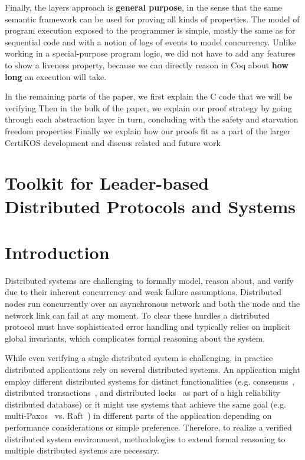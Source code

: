 Finally, the layers approach is {\bf general purpose}, in the sense
that the same semantic framework can be used for proving all kinds of
properties. The model of program execution exposed to the programmer
is simple, mostly the same as for sequential code and with a notion of logs of events to model concurrency.
Unlike working in a special-purpose program logic, we 
did not have to add any features to show a liveness property, because we can directly reason in Coq about \textbf{how long} an execution will take. 

In the remaining parts of the paper, we first explain the C code that we will be verifying 
Then in the bulk of the paper, we explain our proof strategy by going through each abstraction layer in turn, concluding with the safety and starvation freedom properties Finally we explain how our proofs fit as a part of the larger CertiKOS development and discuss related and future work



\section{Toolkit for Leader-based Distributed Protocols and Systems}
\label{chapter:introduction:sec:toolkit-for-leader-based-distributed-protocols-and-systems}

\section{Introduction}
\label{sec:intro}


Distributed systems are challenging to formally model, reason about, and verify
due to their inherent concurrency and weak failure assumptions. Distributed
nodes run concurrently over an asynchronous network and both the node and the
network link can fail at any moment. To clear these hurdles a distributed
protocol must have sophisticated error handling and typically relies on implicit
global invariants, which complicates formal reasoning about the system.


While even verifying a single distributed system is challenging, in practice
distributed applications rely on several distributed systems. An application
might employ different distributed systems for distinct functionalities (e.g.
consensus~\cite{vivaladifference}, distributed transactions~\cite{gray:2006},
and distributed locks~\cite{chubby, zookeeper} as part of a high reliability
distributed database) or it might use systems that achieve the same goal (e.g.
multi-Paxos~\cite{paxosmadesimple, rvrpaxos} vs. Raft~\cite{raft}) in different
parts of the application depending on performance considerations or simple
preference. Therefore, to realize a verified distributed system environment,
methodologies to extend formal reasoning to multiple distributed systems are
necessary.


